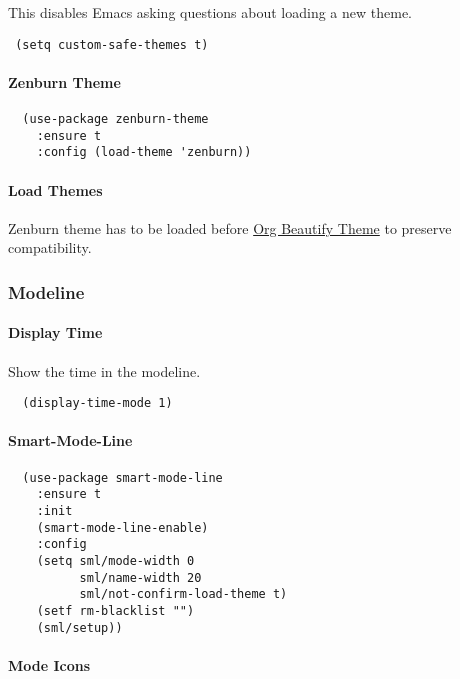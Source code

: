 \documentclass[11pt]{article}
\begin{document}
This disables Emacs asking questions about loading a new theme.

\begin{verbatim}
 (setq custom-safe-themes t)
\end{verbatim}


\paragraph*{Zenburn Theme}
\label{sec:org735d108}

\begin{verbatim}
  (use-package zenburn-theme
    :ensure t
    :config (load-theme 'zenburn))
\end{verbatim}

\paragraph*{Load Themes}
\label{sec:org02f05c6}

Zenburn theme has to be loaded before \hyperref[org-beautify-theme]{Org Beautify Theme} to preserve compatibility.

\subsubsection*{Modeline}
\label{sec:orga13267f}
\paragraph*{Display Time}
\label{sec:orga850998}

Show the time in the modeline.

\begin{verbatim}
  (display-time-mode 1)
\end{verbatim}

\paragraph*{Smart-Mode-Line}
\label{sec:org51bb720}

\begin{verbatim}
  (use-package smart-mode-line
    :ensure t
    :init
    (smart-mode-line-enable)
    :config
    (setq sml/mode-width 0
          sml/name-width 20
          sml/not-confirm-load-theme t)
    (setf rm-blacklist "")
    (sml/setup))
\end{verbatim}

\paragraph*{Mode Icons}
\label{sec:orgaf77438}
\end{document}
